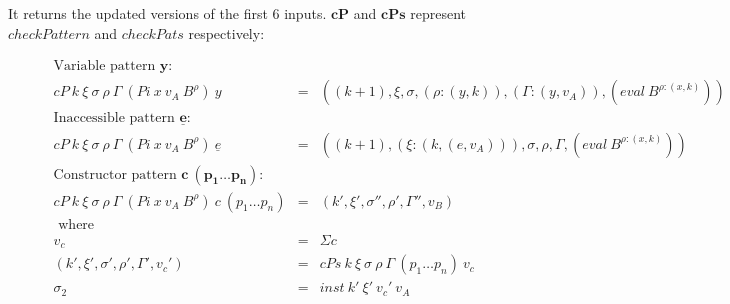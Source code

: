 It returns the updated versions of the first 6 inputs. $\boldsymbol{cP}$ and $\boldsymbol{cPs}$ represent $checkPattern$ and $checkPats$ respectively:

\begin{figure}[H]
  \begin{equation*}
    \begin{aligned}
      \textrm{Variable pattern $\boldsymbol{y}$:}                                                                                                                                                   \\
      cP \: k \: \xi \: \sigma \: \rho \: \Gamma \: (Pi \: x \: v_A \: B^{\rho}) \: y                    & = & ((k+1), \xi, \sigma, (\rho : (y,k)), (\Gamma : (y,v_A)), (eval \: B^{\rho : (x,k)})) \\
      \textrm{Inaccessible pattern $\boldsymbol{\underline{e}}$:}                                                                                                                                   \\
      cP \: k \: \xi \: \sigma \: \rho \: \Gamma \: (Pi \: x \: v_A \: B^{\rho}) \: \underline{e}        & = & ((k+1), (\xi : (k,(e,v_A))), \sigma, \rho, \Gamma, (eval \: B^{\rho : (x,k)}))       \\
      \textrm{Constructor pattern $\boldsymbol{c \: (p_1 \dots p_n)}$:}                                                                                                                             \\
      cP \: k \: \xi \: \sigma \: \rho \: \Gamma \: (Pi \: x \: v_A \: B^{\rho}) \: c \: (p_1 \dots p_n) & = & (k', \xi', \sigma'', \rho', \Gamma'', v_B)                                           \\
      \textrm{ where }                                                                                   &   &                                                                                      \\
      v_c                                                                                                & = & \Sigma c                                                                             \\
      (k',\xi',\sigma',\rho',\Gamma',v_c')                                                               & = & cPs \: k \: \xi \: \sigma \: \rho \: \Gamma \: (p_1 \dots p_n) \: v_c                \\
      \sigma_2                                                                                           & = & inst \: k' \: \xi' \: v_c' \: v_A                                                    \\

\end{aligned}
\end{equation*}
\end{figure}
